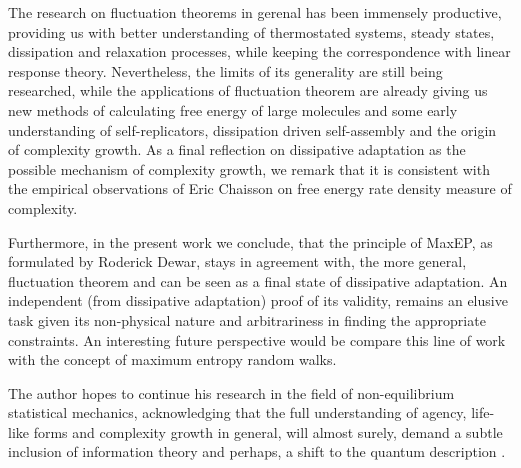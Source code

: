 \documentclass[a4paper,12pt]{article}
\begin{document}
The research on fluctuation theorems in gerenal has been immensely productive, providing us with better understanding of thermostated systems, steady states, dissipation and relaxation processes, while keeping the correspondence with linear response theory. Nevertheless, the limits of its generality are still being researched, while the applications of fluctuation theorem are already giving us new methods of calculating free energy of large molecules and some early understanding of self-replicators, dissipation driven self-assembly and the origin of complexity growth. As a final reflection on dissipative adaptation as the possible mechanism of complexity growth, we remark that it is consistent with the empirical observations of Eric Chaisson \cite{Chaisson:QaChIy8J, Chaisson:inPaa3oF} on free energy rate density measure of complexity.

Furthermore, in the present work we conclude, that the principle of MaxEP, as formulated by Roderick Dewar, stays in agreement with, the more general, fluctuation theorem and can be seen as a final state of dissipative adaptation. An independent (from dissipative adaptation) proof of its validity, remains an elusive task given its non-physical nature and arbitrariness in finding the appropriate constraints. An interesting future perspective would be compare this line of work with the concept of maximum entropy random walks.

The author hopes to continue his research in the field of non-equilibrium statistical mechanics, acknowledging that the full understanding of agency, life-like forms and complexity growth in general, will almost surely, demand a subtle inclusion of information theory and perhaps, a shift to the quantum description \cite{Kurchan:2000uh}.


\newpage



\end{document}
